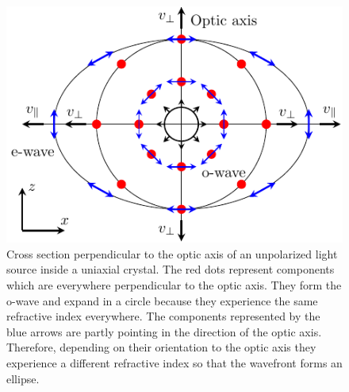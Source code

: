 \begin{figure}[h]
    \centering
    \includegraphics[scale=0.73]{images/theory/tikz_uniaxial_source.pdf}
    \caption{Cross section perpendicular to the optic axis of an unpolarized light source inside a uniaxial crystal. The red dots represent components which are everywhere perpendicular to the optic axis. They form the o-wave and expand in a circle because they experience the same refractive index everywhere. The components represented by the blue arrows are partly pointing in the direction of the optic axis. Therefore, depending on their orientation to the optic axis they experience a different refractive index so that the wavefront forms an ellipse.}
    \label{fig:uniaxial_source}
\end{figure}

